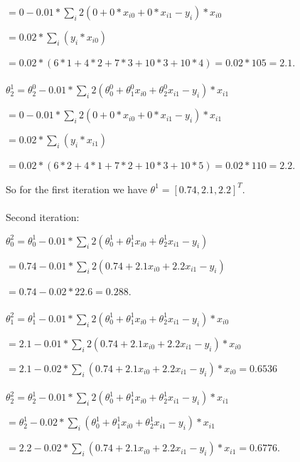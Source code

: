 \documentclass[12pt]{article}
\begin{document}
\begin{enumerate}
  $= 0 - 0.01 * \sum\limits_{i} 2 (0 + 0 * x_{i0} + 0 * x_{i1} - y_i) * x_{i0}$
  
  $= 0.02 * \sum\limits_{i} (y_i * x_{i0})$

  $= 0.02 * (6 * 1 + 4 * 2 + 7 * 3 + 10 * 3 + 10 * 4) = 0.02 * 105 = 2.1$. \\ \\

  $\theta^1_2 = \theta^0_2 - 0.01 * \sum\limits_{i} 2 (\theta^0_0 + \theta^0_1 x_{i0} + \theta^0_2 x_{i1} - y_i) * x_{i1}$

  $ = 0 - 0.01 * \sum\limits_{i} 2 (0 + 0 * x_{i0} + 0 * x_{i1} - y_i) * x_{i1}$
  
  $ = 0.02 * \sum\limits_{i} (y_i * x_{i1})$

  $ = 0.02 * (6 * 2 + 4 * 1 + 7 * 2 + 10 * 3 + 10 * 5) = 0.02 * 110 = 2.2$.

  So for the first iteration we have $\theta^1 = [0.74, 2.1, 2.2]^T$. \\ \\

  Second iteration:

  $\theta^2_0 = \theta^1_0 - 0.01 * \sum\limits_{i} 2 (\theta^1_0 + \theta^1_1 x_{i0} + \theta^1_2 x_{i1} - y_i)$

  $= 0.74 - 0.01 * \sum\limits_{i} 2 (0.74 + 2.1 x_{i0} + 2.2 x_{i1} - y_i)$
  
  $= 0.74 - 0.02 * 22.6 = 0.288$. \\ \\

  $\theta^2_1 = \theta^1_1 - 0.01 * \sum\limits_{i} 2 (\theta^1_0 + \theta^1_1 x_{i0} + \theta^1_2 x_{i1} - y_i) * x_{i0}$
  
  $= 2.1 - 0.01 * \sum\limits_{i} 2 (0.74 + 2.1 x_{i0} + 2.2 x_{i1} - y_i) * x_{i0}$
  
  $= 2.1 - 0.02 * \sum\limits_{i} (0.74 + 2.1 x_{i0} + 2.2 x_{i1} - y_i) * x_{i0} = 0.6536$ \\ \\

  $\theta^2_2 = \theta^1_2 - 0.01 * \sum\limits_{i} 2 (\theta^1_0 + \theta^1_1 x_{i0} + \theta^1_2 x_{i1} - y_i) * x_{i1}$

  $ = \theta^1_2 - 0.02 * \sum\limits_{i} (\theta^1_0 + \theta^1_1 x_{i0} + \theta^1_2 x_{i1} - y_i) * x_{i1}$
  
  $ = 2.2 - 0.02 * \sum\limits_{i} (0.74 + 2.1 x_{i0} + 2.2 x_{i1} - y_i) * x_{i1} = 0.6776$. \\ \\


\end{enumerate}
\end{document}
